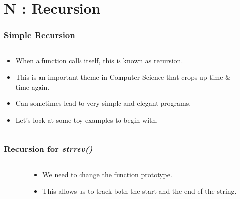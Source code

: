 \section{N : Recursion}
\label{chap:recurs}


\begin{frame}[fragile]
\frametitle{Simple Recursion}
\begin{columns}[T]

\begin{column}{0.45\textwidth}
\begin{itemize}[<+->]
\item When a function calls itself, this is known as recursion.
\item This is an important theme in Computer Science that crops up
time \& time again.
\item Can sometimes lead to very simple and elegant programs.
\item Let's look at some toy examples to begin with.
\end{itemize}
\end{column}

\pause
\begin{column}{0.45\textwidth}

\end{column}

\end{columns}
\end{frame}


\begin{frame}[fragile]
\frametitle{Recursion for {\em strrev()}}

\begin{columns}[T]

\begin{column}{0.45\textwidth}

\end{column}

\pause
\begin{column}{0.45\textwidth}
\begin{itemize}[<+->]
\item We need to change the function prototype.
\item This allows us to track both the start and the end of the string.
\end{itemize}
\end{column}

\end{columns}
\end{frame}

